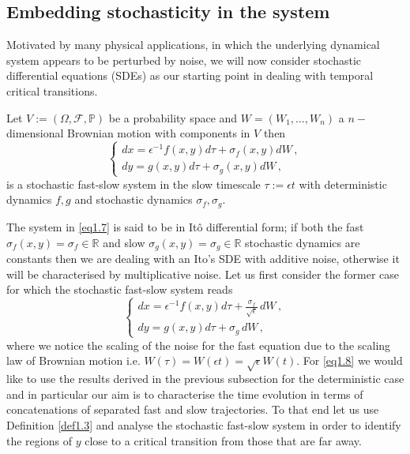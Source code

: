 \documentclass[../main.tex]{subfiles}
\begin{document}
\subsection{Embedding stochasticity in the system}\label{subsec2.2}
Motivated by many physical applications, in which the underlying dynamical system appears to be perturbed by noise, we will now consider stochastic differential equations (SDEs) as our starting point in dealing with temporal critical transitions.
\begin{definition}\label{def1.4}
     Let $V:=(\Omega,\mathcal{F},\mathbb{P})$ be a probability space and $W=(W_1, \dots, W_n)$ a $n-$dimensional Brownian motion with components in $V$ then
     \begin{equation}\label{eq1.7}
        \begin{cases}
           dx = \epsilon^{-1} f(x,y)d\tau + \sigma_f(x,y)dW \,, \\
           dy = g(x,y)d\tau + \sigma_g(x,y)dW \,, 
        \end{cases}
     \end{equation}
     is a stochastic fast-slow system in the slow timescale $\tau:=\epsilon t$ with deterministic dynamics $f,g$ and stochastic dynamics $\sigma_f,\sigma_g$. 
\end{definition}
The system in \eqref{eq1.7} is said to be in Itô differential form; if both the fast $\sigma_f(x,y)=\sigma_f\in\mathbb{R}$ and slow $\sigma_g(x,y)=\sigma_g\in \mathbb{R}$ stochastic dynamics are constants then we are dealing with an Ito's SDE with additive noise, otherwise it will be characterised by multiplicative noise.
Let us first consider the former case for which the stochastic fast-slow system reads
\begin{equation}\label{eq1.8}
   \begin{cases}
      dx = \epsilon^{-1} f(x,y)d\tau + \frac{\sigma_f}{\sqrt{\epsilon}}\,dW\,, \\
      dy = g(x,y)d\tau + \sigma_g\,dW \,, 
   \end{cases}
\end{equation}
where we notice the scaling of the noise for the fast equation due to the scaling law of Brownian motion i.e. $W(\tau)=W(\epsilon t)=\sqrt{\epsilon}W(t)$.
For \eqref{eq1.8} we would like to use the results derived in the previous subsection for the deterministic case and in particular our aim is to characterise the time evolution in terms of concatenations of separated fast and slow trajectories.
To that end let us use Definition \ref{def1.3} and analyse the stochastic fast-slow system in order to identify the regions of $y$ close to a critical transition from those that are far away. 
\end{document}
